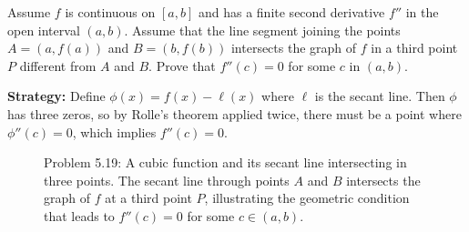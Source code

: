 \begin{problembox}
Assume \( f \) is continuous on \( [a, b] \) and has a finite second derivative \( f'' \) in the open interval \( (a, b) \). Assume that the line segment joining the points \( A = (a, f(a)) \) and \( B = (b, f(b)) \) intersects the graph of \( f \) in a third point \( P \) different from \( A \) and \( B \). Prove that \( f''(c) = 0 \) for some \( c \) in \( (a, b) \).
\end{problembox}

\noindent\textbf{Strategy:} Define \( \phi(x) = f(x) - \ell(x) \) where \( \ell \) is the secant line. Then \( \phi \) has three zeros, so by Rolle's theorem applied twice, there must be a point where \( \phi''(c) = 0 \), which implies \( f''(c) = 0 \).

\begin{figure}[h]
\centering
{}
\caption{Problem 5.19: A cubic function and its secant line intersecting in three points. The secant line through points $A$ and $B$ intersects the graph of $f$ at a third point $P$, illustrating the geometric condition that leads to $f''(c) = 0$ for some $c \in (a,b)$.}
\end{figure}

